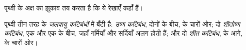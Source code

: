 पृथ्वी के अक्ष का झुकाव तय करता है कि ये रेखाएँ कहाँ हैं।

\begin{definition}[जलवायु कटिबंध]\label{def:g5:weather-and-climate:climate-zone}
पृथ्वी तीन तरह के \emph{जलवायु कटिबंधों} में बँटी है: \emph{उष्ण कटिबंध}, दोनों  के बीच,  के चारों ओर;
दो \emph{शीतोष्ण कटिबंध}, एक  और एक  के बीच, जहाँ
गर्मियाँ और सर्दियाँ अलग होती हैं; और दो \emph{शीत कटिबंध},  के
आगे,  के चारों ओर।
\end{definition}

